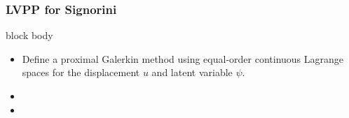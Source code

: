 \documentclass[aspectratio=169,xcolor=dvipsnames,11pt]{beamer}
\begin{document}
\begin{frame}\frametitle{LVPP for Signorini}
\begin{beamercolorbox}[rounded=true, shadow=true, wd=\textwidth]{block body}
\begin{itemize}
\item Define a \alert{proximal Galerkin method} using equal-order continuous Lagrange spaces for the displacement $u$ and latent variable $\psi$.
\item {}
\item {}
\end{itemize}
\end{beamercolorbox}
\end{frame}
\end{document}
